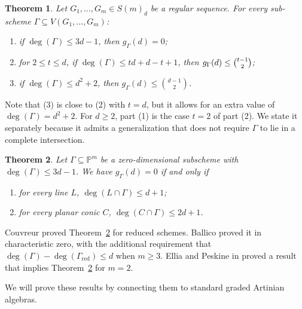 \documentclass[11pt]{amsart}
\newtheorem{theorem}{Theorem}[section]
\theoremstyle{definition}
\newcommand{\PP}{\mathbb{P}}
\newcommand{\ka}{\kappa}
\newcommand{\gG}{g_{\Gamma}}
\begin{document}
\begin{theorem}\label{Thm: main result g_Gamma}
Let $G_1, \dots, G_m\in S(m)_d$ be a regular sequence. For every sub-scheme $\Gamma\subseteq V(G_1,\dots, G_m)$:
\begin{enumerate}
\item if $\deg(\Gamma) \leq 3d-1$, then $\gG(d)=0$;
\item for $2\leq t\leq d$, if $\deg(\Gamma)\leq td+d-t+1$, then $g_{\Gamma}(d)\leq \tbinom{t-1}{2}$;
\item if $\deg(\Gamma) \leq d^2+2$, then $\gG(d) \leq \binom{d-1}{2}$.
\end{enumerate}
\end{theorem}

Note that (3) is close to (2) with $t=d$, but it allows for an extra value of $\deg(\Gamma)=d^2+2$.
For $d\geq 2$, part (1) is the case $t=2$ of part (2).
We state it separately because it admits a generalization
that does not require $\Gamma$ to lie in a complete intersection.


\begin{theorem}\label{Thm: 3d-1 geometric}
Let $\Gamma\subseteq \PP^m$ be a zero-dimensional subscheme with $\deg(\Gamma)\leq 3d-1$. 
We have $g_{\Gamma}(d)=0$ if and only if
\begin{enumerate}
\item for every line $L$, $\deg(L\cap \Gamma)\leq d+1$;
\item for every planar conic $C$, $\deg(C\cap \Gamma)\leq 2d+1$.
\end{enumerate}
\end{theorem}
Couvreur \cite{couvreur2012dual} proved Theorem~\ref{Thm: 3d-1 geometric} for reduced schemes. Ballico \cite{ballico2013gaps} proved it in characteristic zero, with the additional requirement that $\deg(\Gamma)-\deg(\Gamma_{\textrm{red}})\leq d$ when $m\geq 3$.
Ellia and Peskine in \cite{ellia2006groupes} proved a result that implies Theorem~\ref{Thm: 3d-1 geometric} for $m=2$.

We will prove these results by connecting them to standard graded Artinian algebras. 


\end{document}

